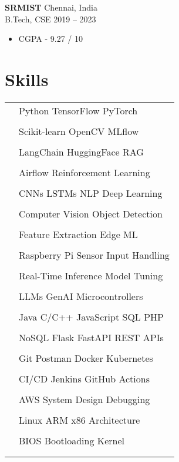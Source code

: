 \documentclass[12pt]{article}
\newcommand{\entry}[4]{{{\textbf{#1}}} \hfill #3 \\ #2 \hfill #4}
\newcommand{\tableentry}[3]{\textsc{#1} & #2\expandafter\ifstrequal\expandafter{#3}{}{\\}{\\[6pt]}}
\begin{document}
\begin{paracol}{2}
\begin{itemize}[noitemsep,leftmargin=3.5mm,rightmargin=0mm,topsep=6pt]
		\end{itemize}
		
		\medskip
		
		\entry{SRMIST}{B.Tech, CSE}{Chennai, India}{2019 -- 2023}
		\begin{itemize}[noitemsep,leftmargin=3.5mm,rightmargin=0mm,topsep=6pt]
			\item CGPA - 9.27 / 10
		\end{itemize}
		
		
		\section{Skills}
		\begin{supertabular}{rl}
			
			\tableentry{\footnotesize\faRobot}{Python \textperiodcentered{} TensorFlow \textperiodcentered{} PyTorch \textperiodcentered{} }{}
			\tableentry{}{ Scikit-learn \textperiodcentered{} OpenCV \textperiodcentered{} MLflow}{}
			\tableentry{}{LangChain \textperiodcentered{} HuggingFace \textperiodcentered{} RAG \textperiodcentered{}}{}
			\tableentry{}{Airflow \textperiodcentered{} Reinforcement Learning \textperiodcentered{}}{}
			\tableentry{}{CNNs \textperiodcentered{} LSTMs \textperiodcentered{} NLP \textperiodcentered{} Deep Learning}{}
			\tableentry{}{Computer Vision \textperiodcentered{} Object Detection \textperiodcentered{}}{}
			\tableentry{}{Feature Extraction \textperiodcentered{} Edge ML \textperiodcentered{}}{}
			\tableentry{}{Raspberry Pi \textperiodcentered{} Sensor Input Handling}{}
			\tableentry{}{Real-Time Inference \textperiodcentered{} Model Tuning \textperiodcentered{}}{}
			\tableentry{}{LLMs \textperiodcentered{} GenAI \textperiodcentered{} Microcontrollers}{}
			
			\tableentry{\footnotesize\faCode}{Java \textperiodcentered{} C/C++ \textperiodcentered{} JavaScript \textperiodcentered{} SQL \textperiodcentered{} PHP}{}
			\tableentry{}{NoSQL \textperiodcentered{} Flask \textperiodcentered{} FastAPI \textperiodcentered{} REST APIs \textperiodcentered{}}{}
			\tableentry{}{Git \textperiodcentered{} Postman \textperiodcentered{} Docker \textperiodcentered{} Kubernetes \textperiodcentered{}}{}
			\tableentry{}{CI/CD \textperiodcentered{} Jenkins \textperiodcentered{} GitHub Actions}{}
			\tableentry{}{AWS \textperiodcentered{} System Design \textperiodcentered{} Debugging}{}
			\tableentry{}{Linux \textperiodcentered{} ARM \textperiodcentered{} x86 Architecture}{}
			\tableentry{}{BIOS \textperiodcentered{} Bootloading \textperiodcentered{} Kernel}{}
			

\end{supertabular}
\end{paracol}
\end{document}
